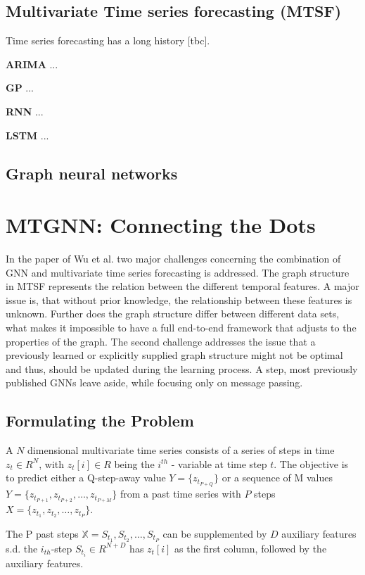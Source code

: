 \documentclass[letterpaper,twocolumn,11pt]{article}
\begin{document}
    \subsection{Multivariate Time series forecasting (MTSF)}
    Time series forecasting has a long history [tbc].

    \textbf{ARIMA} ...

    \textbf{GP} ...

    \textbf{RNN} ...

    \textbf{LSTM}  ...

    \subsection{Graph neural networks}


    \section{MTGNN: Connecting the Dots}
    In the paper of Wu et al. \cite{wu2020connecting} two major challenges concerning the combination of GNN and multivariate
    time series forecasting is addressed.
    The graph structure in MTSF represents the relation between the different temporal features.
    A major issue is, that without prior knowledge, the relationship between these features is unknown.
    Further does the graph structure differ between different data sets, what makes it impossible to have a full end-to-end framework that adjusts to the properties of the graph.
    The second challenge addresses the issue that a previously learned or explicitly supplied graph structure might not be optimal and thus,
    should be updated during the learning process.
    A step, most previously published GNNs leave aside, while focusing only on message passing.

    \subsection{Formulating the Problem}
    A $N$ dimensional multivariate time series consists of a series of steps in time $z_t \in R^N$, with $z_t[i] \in R$
    being the $i^{th}$ - variable at time step $t$. The objective is to predict either a Q-step-away value
    $Y = \{z_{t_{P+Q}}\}$ or a sequence of M values $Y = \{z_{t_{P+1}}, z_{t_{P+2}},\dots,z_{t_{P+M}}\}$
    from a past time series with $P$ steps $X = \{z_{t_{1}}, z_{t_{2}},\dots,z_{t_{P}}\}$.

    The P past steps  $\mathbb{X} = {S_{t_1}, S_{t_2}, \dots, S_{t_P}}$ can be supplemented by $D$ auxiliary features s.d. the $i_{th}$-step
    $S_{t_i} \in R^{N+D}$ has $z_t[i]$ as the first column, followed by the auxiliary features.
\end{document}

